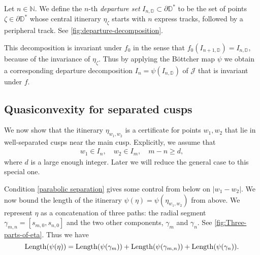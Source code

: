 \begin{definition}
Let $n \in \mathbb N$. We define the $n$-th \emph{departure set} $I_{n, \mathbb D} \subset \partial \mathbb D ^*$ to be the set of points $\zeta \in \partial \mathbb D^*$ whose central itinerary $\eta_{\zeta}$ starts with $n$ express tracks, followed by a peripheral track.
See \cref{fig:departure-decomposition}.
\end{definition}

This decomposition is invariant under $f_0$ in the sense that $f_0(I_{n+1, \mathbb D})=I_{n, \mathbb D}$, because of the invariance of $\eta _\zeta$.
Thus by applying the Böttcher map $\psi$ we obtain a corresponding departure decomposition $I_n = \psi(I_{n, \mathbb D})$ of $\mathcal J$ that is invariant under $f$.


\subsection{Quasiconvexity for separated cusps}
We now show that the itinerary $\eta_{w_1,w_2}$ is a certificate for points $w_1,w_2$ that lie in well-separated cusps near the main cusp. Explicitly, we assume that
\begin{align} \label{parabolic separation}
	w_1 \in I_n, \quad w_2 \in I_m, \quad m-n \geq d,
\end{align}
where $d$ is a large enough integer.
Later we will reduce the general case to this special one.

Condition \eqref{parabolic separation} gives some control from below on $|w_1-w_2|$. We now bound the length of the itinerary $\psi(\eta)=\psi(\eta_{w_1,w_2})$ from above.
We represent $\eta$ as a concatenation of three paths: the radial segment $\gamma_{m,n}=[s_{m,0},s_{n,0}]$ and the two other components, $\gamma _m$ and $\gamma_n$. See \cref{fig:Three-parts-of-eta}.
Thus we have
\begin{equation}
	\operatorname{Length}(\psi(\eta))=\operatorname{Length}(\psi(\gamma_m))+\operatorname{Length}(\psi(\gamma_{m,n}))+\operatorname{Length}(\psi(\gamma_n)).
\end{equation}




